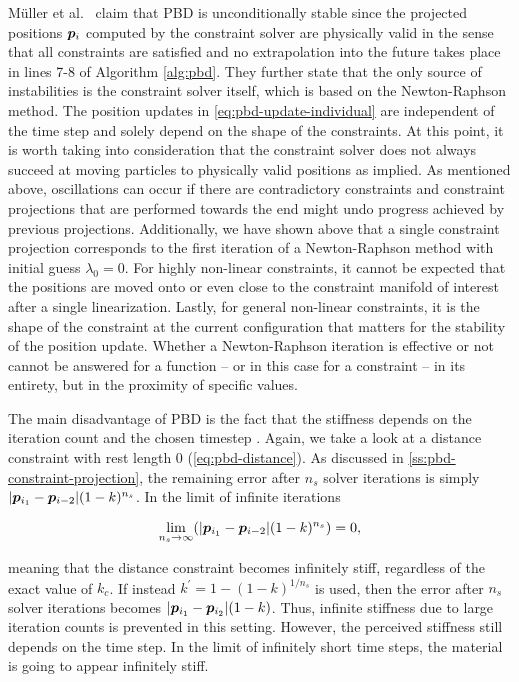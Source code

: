 Müller et al.\ \cite{mueller2006} claim that PBD is unconditionally stable since the projected positions $\bm{p}_i$ computed by the constraint 
solver are physically valid in the sense that all constraints are satisfied and no extrapolation into the future takes place in lines 7-8 of
Algorithm \ref{alg:pbd}. They further state that the only source of instabilities is the constraint solver itself, which is based on the Newton-Raphson 
method. The position updates in \autoref{eq:pbd-update-individual} are independent of the time step and solely depend on the shape of the
constraints. At this point, it is worth taking into consideration that the constraint solver does not always succeed at moving particles to 
physically valid
positions as implied. As mentioned above, oscillations can occur if there are contradictory constraints and constraint projections that are 
performed towards the end might undo progress achieved by previous projections. Additionally, we have shown above that a single constraint 
projection corresponds to the first iteration of a Newton-Raphson method with initial guess $\lambda_0 = 0$. For highly non-linear constraints, 
it cannot be expected that the positions are moved onto or even close to the constraint manifold of interest after a single linearization. 
Lastly, for general non-linear constraints, it is the shape of the constraint at the current configuration that matters for the stability of 
the position update. Whether a Newton-Raphson iteration is effective or not cannot be answered for a function -- or in this case for a 
constraint -- in its entirety, but in the proximity of specific values.

The main disadvantage of PBD is the fact that the stiffness depends on the iteration count and the chosen timestep \cite{mueller2006}. Again, 
we take a look at
a distance constraint with rest length 0 (\cref{eq:pbd-distance}). As discussed in \cref{ss:pbd-constraint-projection}, the remaining error after
$n_s$ solver iterations is simply $\vert \bm{p}_{i_1} - \bm{p}_{i-2} \vert (1-k)^{n_s}$. In the limit of infinite iterations

\[
    \lim_{n_s \to \infty} (\vert \bm{p}_{i_1} - \bm{p}_{i-2} \vert (1-k)^{n_s}) = 0,
\]

\noindent meaning that the distance constraint becomes infinitely stiff, regardless of the exact value of $k_c$. If instead $k^{\prime}
= 1 - (1-k)^{1/n_s}$ is used, then the error after $n_s$ solver iterations becomes $\vert \bm{p}_{i_1} - \bm{p}_{i_2} \vert (1-k)$. Thus,
infinite stiffness due to large iteration counts is prevented in this setting. However, the perceived stiffness still depends on the time
step. In the limit of infinitely short time steps, the material is going to appear infinitely stiff. 

